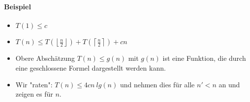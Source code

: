 \documentclass[
    ngerman,
    color=3b,
    dark_mode,
    load_common, %
    summary,
    boxarc,
]{rubos-tuda-template}
\begin{document}
\paragraph{Beispiel}\mbox{}
\begin{description}[itemsep=1em]
    \item [Betrachten von \texttt{MergeSort}]
          \begin{itemize}
              \item $T(1) \leq c$
                    \vspace*{-1em}
              \item $T(n) \leq T(\left \lfloor \frac{n}{2} \right \rfloor) + T(\left \lceil \frac{n}{2} \right \rceil) + cn$
          \end{itemize}

    \item [Ziel]
          \begin{itemize}
              \item[]
                  Obere Abschätzung $T(n) \leq g(n)$ mit $g(n)$ ist eine Funktion, die durch eine
                  geschlossene Formel dargestellt werden kann.
              \item[]
                  Wir \string"raten\string": $T(n) \leq 4cn~lg(n)$ und nehmen dies für alle $n' < n$ an und
                  zeigen es für $n$.
          \end{itemize}


\end{description}
\end{document}
